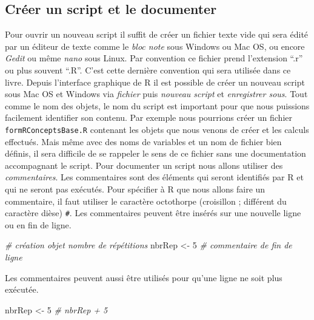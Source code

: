 \documentclass[
]{book}
\newenvironment{Shaded}{\begin{snugshade}}{\end{snugshade}}
\newcommand{\CommentTok}[1]{\textcolor[rgb]{0.56,0.35,0.01}{\textit{#1}}}
\newcommand{\DecValTok}[1]{\textcolor[rgb]{0.00,0.00,0.81}{#1}}
\newcommand{\NormalTok}[1]{#1}
\newcommand{\StringTok}[1]{\textcolor[rgb]{0.31,0.60,0.02}{#1}}
\begin{document}
\hypertarget{cruxe9er-un-script-et-le-documenter}{%
\subsection{Créer un script et le documenter}\label{cruxe9er-un-script-et-le-documenter}}

Pour ouvrir un nouveau script il suffit de créer un fichier texte vide qui sera édité par un éditeur de texte comme le \emph{bloc note} sous Windows ou Mac OS, ou encore \emph{Gedit} ou même \emph{nano} sous Linux. Par convention ce fichier prend l'extension ``.r'' ou plus souvent ``.R''. C'est cette dernière convention qui sera utilisée dans ce livre. Depuis l'interface graphique de R il est possible de créer un nouveau script sous Mac OS et Windows via \emph{fichier} puis \emph{nouveau script} et \emph{enregistrer sous}.
Tout comme le nom des objets, le nom du script est important pour que nous puissions facilement identifier son contenu. Par exemple nous pourrions créer un fichier \texttt{formRConceptsBase.R} contenant les objets que nous venons de créer et les calculs effectués. Mais même avec des noms de variables et un nom de fichier bien définis, il sera difficile de se rappeler le sens de ce fichier sans une documentation accompagnant le script. Pour documenter un script nous allons utiliser des \emph{commentaires}. Les commentaires sont des éléments qui seront identifiés par R et qui ne seront pas exécutés. Pour spécifier à R que nous allons faire un commentaire, il faut utiliser le caractère octothorpe (croisillon ; différent du caractère dièse) \texttt{\#}. Les commentaires peuvent être insérés sur une nouvelle ligne ou en fin de ligne.

\begin{Shaded}
\begin{Highlighting}[]
\CommentTok{# création objet nombre de répétitions}
\NormalTok{nbrRep <-}\StringTok{ }\DecValTok{5} \CommentTok{# commentaire de fin de ligne}
\end{Highlighting}
\end{Shaded}

Les commentaires peuvent aussi être utilisés pour qu'une ligne ne soit plus exécutée.

\begin{Shaded}
\begin{Highlighting}[]
\NormalTok{nbrRep <-}\StringTok{ }\DecValTok{5}
\CommentTok{# nbrRep + 5}
\end{Highlighting}
\end{Shaded}
\end{document}
